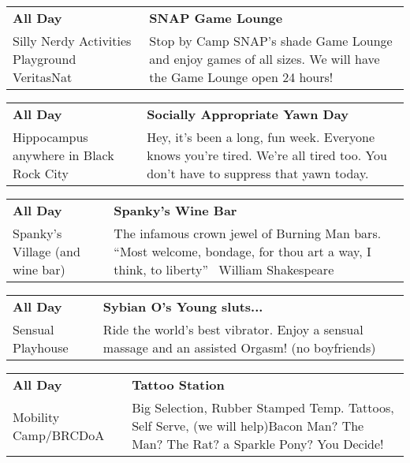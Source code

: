 \begin{tabular}{ p{1in} p{2.2in} }
    \textbf{All Day} & \textbf{SNAP Game Lounge} \\
    Silly Nerdy Activities Playground \newline VeritasNat & Stop by Camp SNAP's shade Game Lounge and enjoy games of all sizes. We will have the Game Lounge open 24 hours! \\
    \hline 
\end{tabular}
    
\begin{tabular}{ p{1in} p{2.2in} }
    \textbf{All Day} & \textbf{Socially Appropriate Yawn Day} \\
    Hippocampus \newline anywhere in Black Rock City & Hey, it's been a long, fun week. Everyone knows you're tired. We're all tired too. You don't have to suppress that yawn today. \\
    \hline 
\end{tabular}
    
\begin{tabular}{ p{1in} p{2.2in} }
    \textbf{All Day} & \textbf{Spanky's Wine Bar} \\
    Spanky's Village (and wine bar) \newline  & The infamous crown jewel of Burning Man bars.  ``Most welcome, bondage, for thou art a way, I think, to liberty''  ~William Shakespeare~ \\
    \hline 
\end{tabular}
    
\begin{tabular}{ p{1in} p{2.2in} }
    \textbf{All Day} & \textbf{Sybian O's Young sluts...} \\
    Sensual Playhouse \newline  & Ride the world's best vibrator. Enjoy a sensual massage and an assisted Orgasm! (no boyfriends) \\
    \hline 
\end{tabular}
    
\begin{tabular}{ p{1in} p{2.2in} }
    \textbf{All Day} & \textbf{Tattoo Station} \\
    Mobility Camp/BRCDoA \newline  & Big Selection, Rubber Stamped Temp. Tattoos, Self Serve, (we will help)Bacon Man? The Man? The Rat? a Sparkle Pony? You Decide! \\
    \hline 
\end{tabular}
    
